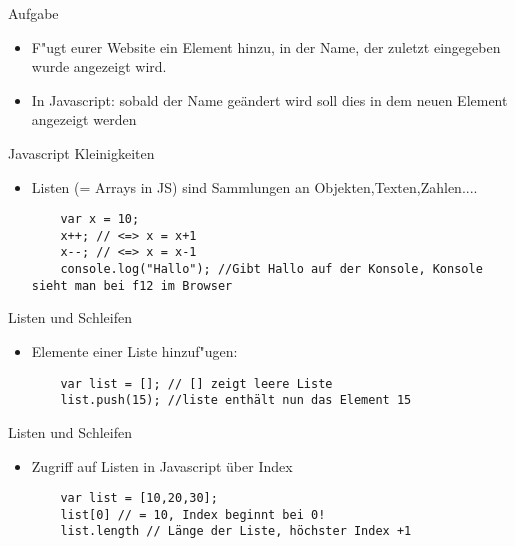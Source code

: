 \documentclass[18pt]{beamer}
\begin{document}
\begin{frame}[fragile]{Aufgabe}
\begin{itemize}
	\item F"ugt eurer Website ein Element hinzu, in der Name, der zuletzt eingegeben wurde angezeigt wird. 
	\item In Javascript: sobald der Name geändert wird soll dies in dem neuen Element angezeigt werden
\end{itemize}
\end{frame}

\begin{frame}[fragile]{Javascript Kleinigkeiten}
\begin{itemize}
	\item Listen (= Arrays in JS) sind Sammlungen an Objekten,Texten,Zahlen....
	\begin{lstlisting}
	var x = 10;
	x++; // <=> x = x+1 
	x--; // <=> x = x-1
	console.log("Hallo"); //Gibt Hallo auf der Konsole, Konsole sieht man bei f12 im Browser
	\end{lstlisting}
\end{itemize}
\end{frame}

\begin{frame}[fragile]{Listen und Schleifen}
\begin{itemize}
		\begin{lstlisting}
	var list = []; // [] zeigt leere Liste
	var list2 = [1,5,10]; // Liste aus 1,5,10
	\end{lstlisting}
	\item Elemente einer Liste hinzuf"ugen: 
		\begin{lstlisting}
	var list = []; // [] zeigt leere Liste
	list.push(15); //liste enthält nun das Element 15
	\end{lstlisting}	
\end{itemize}
\end{frame}


\begin{frame}[fragile]{Listen und Schleifen}
\begin{itemize}
	\item Zugriff auf Listen in Javascript über Index
	\begin{lstlisting}
	var list = [10,20,30];
	list[0] // = 10, Index beginnt bei 0!
	list.length // Länge der Liste, höchster Index +1 
	\end{lstlisting}
\end{itemize}
\end{frame}
\end{document}
